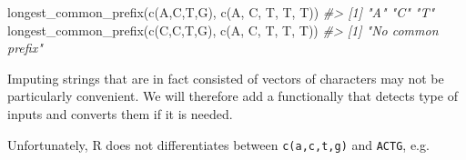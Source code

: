 \documentclass[
]{book}
\newenvironment{Shaded}{\begin{snugshade}}{\end{snugshade}}
\newcommand{\CommentTok}[1]{\textcolor[rgb]{0.56,0.35,0.01}{\textit{#1}}}
\newcommand{\FunctionTok}[1]{\textcolor[rgb]{0.00,0.00,0.00}{#1}}
\newcommand{\NormalTok}[1]{#1}
\newcommand{\StringTok}[1]{\textcolor[rgb]{0.31,0.60,0.02}{#1}}
\begin{document}
\begin{Shaded}
\begin{Highlighting}[]
\FunctionTok{longest\_common\_prefix}\NormalTok{(}\FunctionTok{c}\NormalTok{(}\StringTok{\textquotesingle{}A\textquotesingle{}}\NormalTok{,}\StringTok{\textquotesingle{}C\textquotesingle{}}\NormalTok{,}\StringTok{\textquotesingle{}T\textquotesingle{}}\NormalTok{,}\StringTok{\textquotesingle{}G\textquotesingle{}}\NormalTok{), }\FunctionTok{c}\NormalTok{(}\StringTok{\textquotesingle{}A\textquotesingle{}}\NormalTok{, }\StringTok{\textquotesingle{}C\textquotesingle{}}\NormalTok{, }\StringTok{\textquotesingle{}T\textquotesingle{}}\NormalTok{, }\StringTok{\textquotesingle{}T\textquotesingle{}}\NormalTok{, }\StringTok{\textquotesingle{}T\textquotesingle{}}\NormalTok{))}
\CommentTok{\#\textgreater{} [1] "A" "C" "T"}
\FunctionTok{longest\_common\_prefix}\NormalTok{(}\FunctionTok{c}\NormalTok{(}\StringTok{\textquotesingle{}C\textquotesingle{}}\NormalTok{,}\StringTok{\textquotesingle{}C\textquotesingle{}}\NormalTok{,}\StringTok{\textquotesingle{}T\textquotesingle{}}\NormalTok{,}\StringTok{\textquotesingle{}G\textquotesingle{}}\NormalTok{), }\FunctionTok{c}\NormalTok{(}\StringTok{\textquotesingle{}A\textquotesingle{}}\NormalTok{, }\StringTok{\textquotesingle{}C\textquotesingle{}}\NormalTok{, }\StringTok{\textquotesingle{}T\textquotesingle{}}\NormalTok{, }\StringTok{\textquotesingle{}T\textquotesingle{}}\NormalTok{, }\StringTok{\textquotesingle{}T\textquotesingle{}}\NormalTok{))}
\CommentTok{\#\textgreater{} [1] "No common prefix"}
\end{Highlighting}
\end{Shaded}

Imputing strings that are in fact consisted of vectors of characters may not be particularly convenient. We will therefore add a functionally that detects type of inputs and converts them if it is needed.

Unfortunately, R does not differentiates between \texttt{c(\textquotesingle{}a\textquotesingle{},\textquotesingle{}c\textquotesingle{},\textquotesingle{}t\textquotesingle{},\textquotesingle{}g\textquotesingle{})} and \texttt{\textquotesingle{}ACTG\textquotesingle{}}, e.g.
\end{document}
